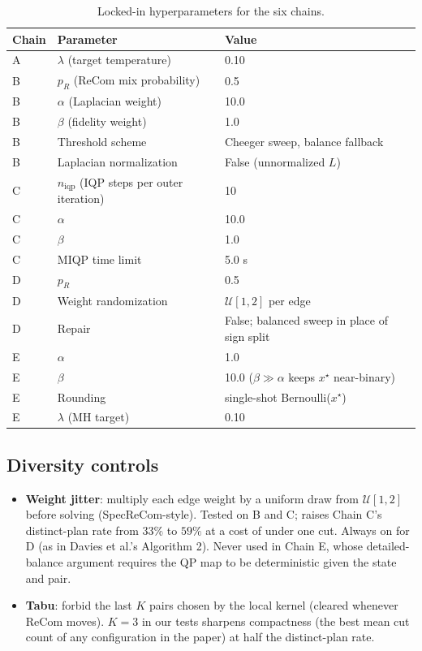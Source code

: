 \documentclass[11pt]{article}
\begin{document}
\begin{table}[H]
\centering
\small
\begin{tabular}{lll}
\toprule
Chain & Parameter & Value \\
\midrule
A & $\lambda$ (target temperature) & 0.10 \\
B & $p_R$ (ReCom mix probability) & 0.5 \\
B & $\alpha$ (Laplacian weight) & 10.0 \\
B & $\beta$ (fidelity weight) & 1.0 \\
B & Threshold scheme & Cheeger sweep, balance fallback \\
B & Laplacian normalization & False (unnormalized $L$) \\
C & $n_{\mathrm{iqp}}$ (IQP steps per outer iteration) & 10 \\
C & $\alpha$ & 10.0 \\
C & $\beta$ & 1.0 \\
C & MIQP time limit & 5.0 s \\
D & $p_R$ & 0.5 \\
D & Weight randomization & $\mathcal{U}[1, 2]$ per edge \\
D & Repair & False; balanced sweep in place of sign split \\
E & $\alpha$ & 1.0 \\
E & $\beta$ & 10.0 ($\beta \gg \alpha$ keeps $x^\star$ near-binary) \\
E & Rounding & single-shot Bernoulli($x^\star$) \\
E & $\lambda$ (MH target) & 0.10 \\
\bottomrule
\end{tabular}
\caption{Locked-in hyperparameters for the six
  chains.}\label{tab:hyperparams}
\end{table}

\subsection{Diversity controls}\label{app:diversity}

\begin{itemize}
  \item \textbf{Weight jitter}: multiply each edge weight by a
    uniform draw from $\mathcal{U}[1, 2]$ before solving (SpecReCom-style). Tested on B
    and C; raises Chain C's distinct-plan rate from $33\%$ to $59\%$
    at a cost of under one cut. Always on for D (as in Davies et
    al.'s Algorithm 2). Never
    used in Chain E, whose detailed-balance argument requires the QP
    map to be deterministic given the state and pair.
  \item \textbf{Tabu}: forbid the last $K$ pairs chosen by the local
    kernel (cleared whenever ReCom moves). $K = 3$ in our tests
    sharpens compactness (the best mean cut count of any
    configuration in the paper) at half the distinct-plan rate.
\end{itemize}
\end{document}
